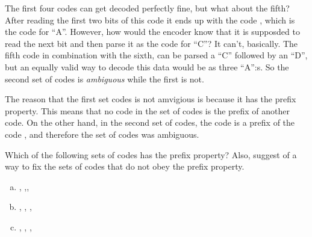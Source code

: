 The first four codes can get decoded perfectly fine, but what about
the fifth? After reading the first two bits of this code it ends up
with the code , which is the code for ``A''. However, how
would the encoder know that it is supposded to read the next bit and
then parse it as the code for ``C''? It can't, basically. The fifth
code in combination with the sixth,  can be parsed a ``C''
followed by an ``D'', but an equally valid way to decode this data
would be as three ``A'':s. So the second set of codes is
\textit{ambiguous} while the first is not.

The reason that the first set codes is not amvigious is because it has
the prefix property. This means that no code in the set of codes is
the prefix of another code. On the other hand, in the second set of
codes, the code  is a prefix of the code , and
therefore the set of codes was ambiguous.

\begin{Exercise}[label={prefix-prop}]

  Which of the following sets of codes has the prefix property?  Also,
  suggest of a way to fix the sets of codes that do not obey the
  prefix property.

  \begin{enumerate}[(a)]
  \item {}, ,,

  \item {}, , , 

  \item {}, , , 

  \end{enumerate}

\end{Exercise}


\newenvironment{huffman}
{\begin{tikzpicture}
    [level distance=10mm,
    hnode/.style={circle,inner sep=1pt,draw=black},
    level 1/.style={sibling distance=20mm},
      level 2/.style={sibling distance=10mm},
      level 3/.style={sibling distance=5mm},
      text height=1.5ex,text depth=.25ex]}{\end{tikzpicture}}

\newenvironment{huffmanc}
{\begin{center}\begin{huffman}}
{\end{huffman}\end{center}}

